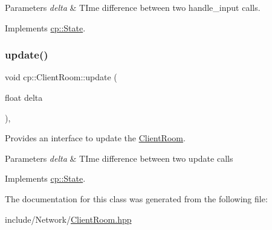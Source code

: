 \begin{DoxyParams}{Parameters}
{\em delta} & T\+Ime difference between two handle\+\_\+input calls. \\
\hline
\end{DoxyParams}


Implements \hyperlink{classcp_1_1_state}{cp\+::\+State}.

\mbox{\label{classcp_1_1_client_room_a09987dd7d61af43329b63a8ba9e3df69}} 
\subsubsection{\texorpdfstring{update()}{update()}}
{\footnotesize\ttfamily void cp\+::\+Client\+Room\+::update (\begin{DoxyParamCaption}\item[{float}]{delta }\end{DoxyParamCaption})\hspace{0.3cm}{\ttfamily [inline]}, {\ttfamily [virtual]}}



Provides an interface to update the \hyperlink{classcp_1_1_client_room}{Client\+Room}. 


\begin{DoxyParams}{Parameters}
{\em delta} & T\+Ime difference between two update calls \\
\hline
\end{DoxyParams}


Implements \hyperlink{classcp_1_1_state}{cp\+::\+State}.



The documentation for this class was generated from the following file\+:\begin{DoxyCompactItemize}
\item 
include/\+Network/\hyperlink{_client_room_8hpp}{Client\+Room.\+hpp}\end{DoxyCompactItemize}

